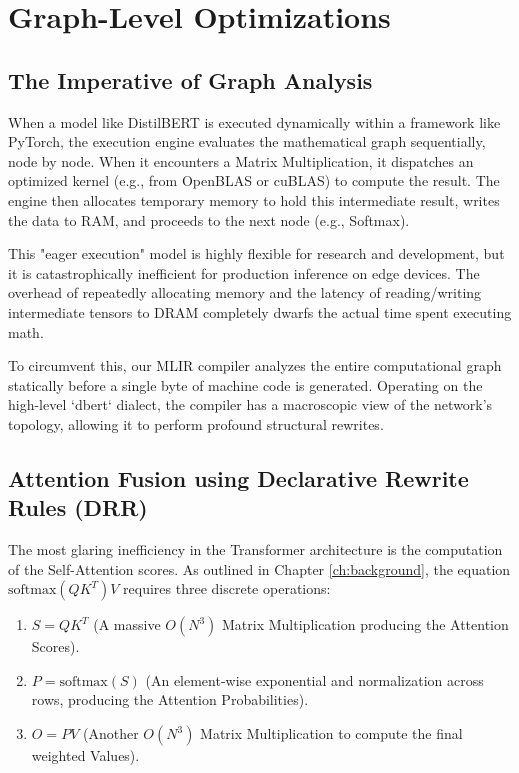 \chapter{Graph-Level Optimizations}
\label{ch:graph_optimizations}

\section{The Imperative of Graph Analysis}
When a model like DistilBERT is executed dynamically within a framework like PyTorch, the execution engine evaluates the mathematical graph sequentially, node by node. When it encounters a Matrix Multiplication, it dispatches an optimized kernel (e.g., from OpenBLAS or cuBLAS) to compute the result. The engine then allocates temporary memory to hold this intermediate result, writes the data to RAM, and proceeds to the next node (e.g., Softmax).

This "eager execution" model is highly flexible for research and development, but it is catastrophically inefficient for production inference on edge devices. The overhead of repeatedly allocating memory and the latency of reading/writing intermediate tensors to DRAM completely dwarfs the actual time spent executing math. 

To circumvent this, our MLIR compiler analyzes the entire computational graph statically before a single byte of machine code is generated. Operating on the high-level `dbert` dialect, the compiler has a macroscopic view of the network's topology, allowing it to perform profound structural rewrites.

\section{Attention Fusion using Declarative Rewrite Rules (DRR)}
The most glaring inefficiency in the Transformer architecture is the computation of the Self-Attention scores. As outlined in Chapter \ref{ch:background}, the equation $\text{softmax}(QK^T)V$ requires three discrete operations:
\begin{enumerate}
    \item $S = QK^T$ (A massive $O(N^3)$ Matrix Multiplication producing the Attention Scores).
    \item $P = \text{softmax}(S)$ (An element-wise exponential and normalization across rows, producing the Attention Probabilities).
    \item $O = PV$ (Another $O(N^3)$ Matrix Multiplication to compute the final weighted Values).
\end{enumerate}

